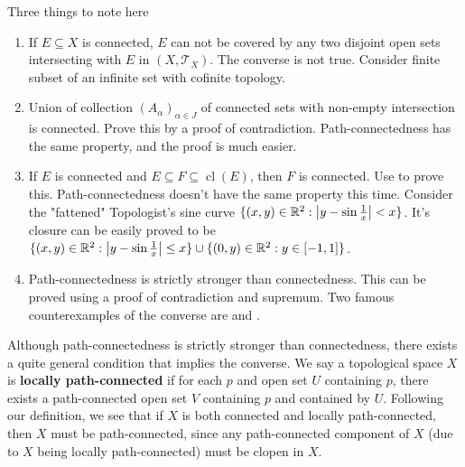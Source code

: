 \documentclass{report}
\begin{document}
\begin{mdframed}
Three things to note here
\begin{enumerate}[label=(\alph*)]
    \item If $E \subseteq X$ is connected, $E$ can not be covered by any two disjoint open sets intersecting with $E$ in $(X, \mathscr{T}_X)$. The converse is not true. Consider finite subset of an infinite set with cofinite topology.
    \item Union of collection $(A_\alpha)_{\alpha \in J}$ of connected sets with non-empty intersection is connected. Prove this by a proof of contradiction. Path-connectedness has the same property, and the proof is much easier.
    \item If $E$ is connected and $E \subseteq F \subseteq \operatorname{cl}(E)$, then $F$ is connected. Use  to prove this. Path-connectedness doesn't have the same property this time. Consider the "fattened" Topologist’s sine curve $\{ (x, y) \in \mathbb{R}^2 : \left| y - \sin \frac{1}{x} \right| < x \}$. It’s closure can be easily proved to be $\{ (x, y) \in \mathbb{R}^2 : \left| y - \sin \frac{1}{x} \right| \leq x \} \cup \{ (0, y) \in \mathbb{R}^2 : y \in [-1, 1] \}$.
    \item Path-connectedness is strictly stronger than connectedness. This can be proved using a proof of contradiction and supremum. Two famous counterexamples of the converse are  and .
\end{enumerate}
\label{local-path}
Although path-connectedness is strictly stronger than connectedness, there exists a quite general condition that implies the converse. We say a topological space $X$ is  \textbf{locally path-connected} if for each $p$ and open set $U$ containing $p$, there exists a path-connected open set  $V$ containing $p$ and contained by $U$. Following our definition, we see that if $X$ is both connected and locally path-connected, then $X$ must be path-connected, since any path-connected component of $X$ (due to $X$ being locally path-connected) must be clopen in $X$. 
\end{mdframed}
\end{document}
